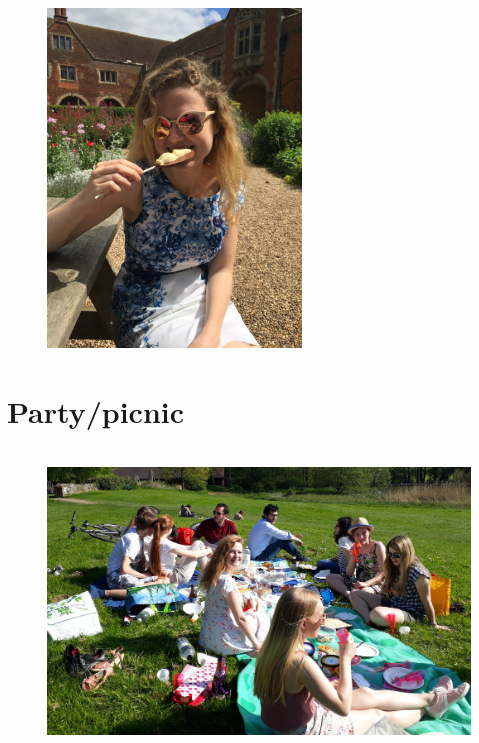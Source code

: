 \documentclass[%
titlepage,
b5paper,
twoside,
11pt
]{book}
\begin{document}
\begin{figure}[h]
	\centering
	\includegraphics[height=9cm,angle=270]{pic/chapter3}
\end{figure}


\newpage

\newpage

\newpage

\newpage

\newpage

\newpage

\newpage

\newpage


\chapter{Party/picnic}


\begin{figure}[h]
	\centering
	\includegraphics[height=8cm,angle=0]{pic/picnic}
\end{figure}


\newpage

\newpage

\newpage

\newpage

\newpage
\end{document}
